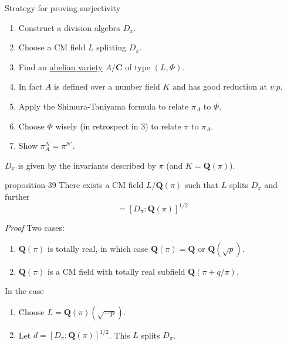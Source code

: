 \documentclass[10pt,]{book}
\makeatletter
\renewcommand*{\proofname}{Proof}
\renewenvironment{proof}[1][\proofname]{\par
  \pushQED{\qed}%
  \normalfont \topsep6\p@\@plus6\p@\relax
  \trivlist
  \item\relax
    {\itshape
    #1\@addpunct{.}}\hspace\labelsep\ignorespaces
}{%
  \popQED\endtrivlist\@endpefalse
}
\numberwithin{equation}{section}
\newcommand{\lb}{[}
\newcommand{\rb}{]}
\newcommand{\QQ}{\mathbf{Q}}
\newcommand{\CC}{\mathbf{C}}
\makeatother
\begin{document}
Strategy for proving surjectivity\leavevmode%
\begin{enumerate}
\item\hypertarget{li-87}{}Construct a division algebra \(D_\pi\).%
\item\hypertarget{li-88}{}Choose a CM field \(L\) splitting \(D_\pi\).%
\item\hypertarget{li-89}{}Find an \hyperref[def-buntes-abvar]{abelian variety} \(A/\CC\) of type \((L, \Phi)\).%
\item\hypertarget{li-90}{}In fact \(A\) is defined over  a number field \(K\) and has good reduction at \(v|p\).%
\item\hypertarget{li-91}{}Apply the Shimura-Taniyama formula to relate \(\pi_A\) to \(\Phi\).%
\item\hypertarget{li-92}{}Choose \(\Phi\) wisely (in retrospect in 3) to relate \(\pi\) to \(\pi_A\).%
\item\hypertarget{li-93}{}Show \(\pi_A^N = \pi^{N'}\).%
\end{enumerate}
%
\par
\hypertarget{p-438}{}%
\(D_\pi\) is given by the invariants described by \(\pi\) (and \(K = \QQ(\pi)\)).%
\begin{proposition}{}{}{proposition-39}%
\hypertarget{p-439}{}%
There exists a CM field \(L/\QQ(\pi)\) such that \(L\) splits \(D_\pi\) and further%
\begin{equation*}
[L:\QQ(\pi) ] = [ D_\pi: \QQ(\pi)]^{1/2}
\end{equation*}
%
\end{proposition}
\begin{proof}\hypertarget{proof-75}{}
\hypertarget{p-440}{}%
Two cases:\leavevmode%
\begin{enumerate}
\item\hypertarget{li-94}{}\(\QQ(\pi)\) is totally real, in which case \(\QQ(\pi) = \QQ\) or \(\QQ(\sqrt{p})\).%
\item\hypertarget{li-95}{}\(\QQ(\pi)\) is a CM field with totally real subfield \(\QQ(\pi + q/\pi)\).%
\end{enumerate}
In the case\leavevmode%
\begin{enumerate}
\item\hypertarget{li-96}{}Choose \(L = \QQ(\pi)(\sqrt{-p})\).%
\item\hypertarget{li-97}{}Let \(d= \lb D_\pi: \QQ(\pi)\rb^{1/2}\). This \(L\) splits \(D_\pi\).%
\end{enumerate}
%
\end{proof}
\hypertarget{p-441}{}%
\end{document}
